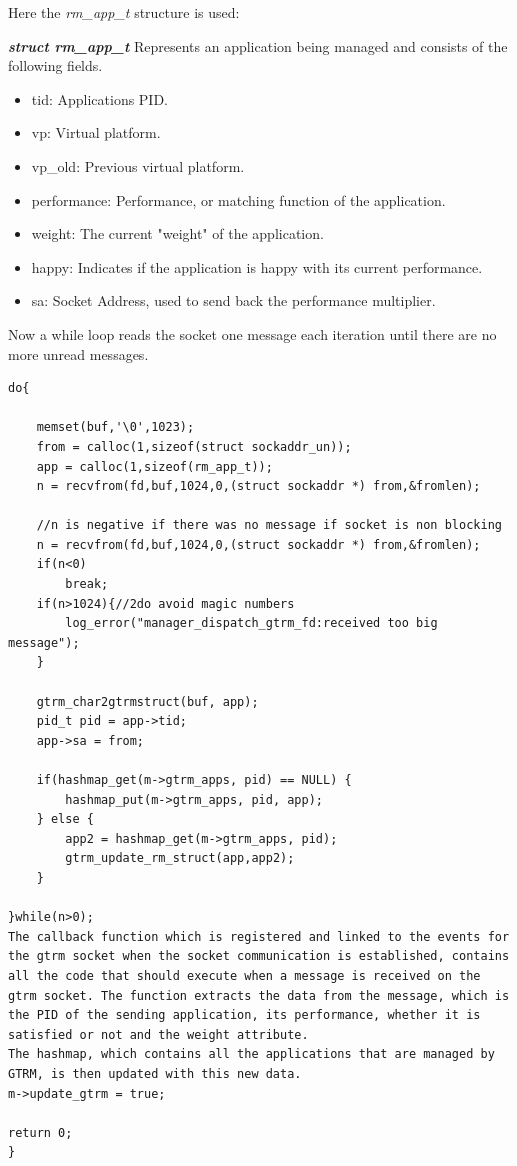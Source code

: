 \documentclass[nobiblatex]{LTHthesis}
\begin{document}
Here the \emph{rm\_app\_t} structure is used:

\begin{framed}
		\begin{flushleft}
			\textbf{\emph{struct rm\_app\_t}}
			Represents an application being managed and consists of the following fields.
			\begin{itemize}
			\item tid: Applications PID.
			\item vp: Virtual platform.
			\item vp\_old: Previous virtual platform.
			\item performance: Performance, or matching function of the application.
			\item weight: The current "weight" of the application.
			\item happy: Indicates if the application is happy with its current performance.
			\item sa: Socket Address, used to send back the performance multiplier.
			\end{itemize}
		\end{flushleft}	
\end{framed}






Now a while loop reads the socket one message each iteration until there are no more unread messages. 

\begin{verbatim}
do{		

	memset(buf,'\0',1023);
	from = calloc(1,sizeof(struct sockaddr_un));
	app = calloc(1,sizeof(rm_app_t));	
	n = recvfrom(fd,buf,1024,0,(struct sockaddr *) from,&fromlen);

	//n is negative if there was no message if socket is non blocking
	n = recvfrom(fd,buf,1024,0,(struct sockaddr *) from,&fromlen);
	if(n<0)
		break;
	if(n>1024){//2do avoid magic numbers
		log_error("manager_dispatch_gtrm_fd:received too big message");
	}	

	gtrm_char2gtrmstruct(buf, app);
	pid_t pid = app->tid;
	app->sa = from;

	if(hashmap_get(m->gtrm_apps, pid) == NULL) {
		hashmap_put(m->gtrm_apps, pid, app);
	} else {
		app2 = hashmap_get(m->gtrm_apps, pid);
		gtrm_update_rm_struct(app,app2);
	}															

}while(n>0);
The callback function which is registered and linked to the events for the gtrm socket when the socket communication is established, contains all the code that should execute when a message is received on the gtrm socket. The function extracts the data from the message, which is the PID of the sending application, its performance, whether it is satisfied or not and the weight attribute. 
The hashmap, which contains all the applications that are managed by GTRM, is then updated with this new data. 
m->update_gtrm = true;

return 0;
}
\end{verbatim}
\end{document}
